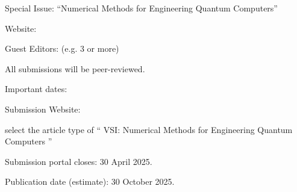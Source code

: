 \documentclass[]{article}
\begin{document}
Special Issue: ``Numerical Methods for Engineering Quantum Computers''
\par\noindent

Website: 
\par\noindent

Guest Editors: (e.g. 3 or more)
\par\noindent

All submissions will be peer-reviewed.
\par\noindent

Important dates:
\par\noindent

Submission Website: 
\par\noindent
select the article type of `` VSI: Numerical Methods for Engineering Quantum Computers '' 
\par\noindent

Submission portal closes: 30 April 2025.
\par\noindent

Publication date (estimate): 30 October 2025.
\par\noindent



\end{document}
